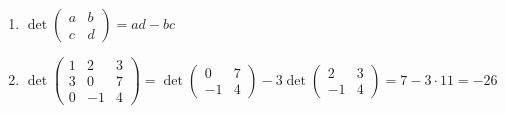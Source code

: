 \begin{ejemplo}\leavevmode
\begin{enumerate}
\item $\det\begin{pmatrix} a & b \\ c & d \end{pmatrix} = ad - bc$
\item $\det\begin{pmatrix} 1 & 2 & 3 \\ 3 & 0 & 7 \\ 0 & -1 & 4 \end{pmatrix} = \det\begin{pmatrix} 0 & 7 \\ -1 & 4 \end{pmatrix} - 3 \det\begin{pmatrix} 2 & 3 \\ -1 & 4 \end{pmatrix} = 7 - 3 \cdot 11=-26$
\end{enumerate}
\end{ejemplo}

